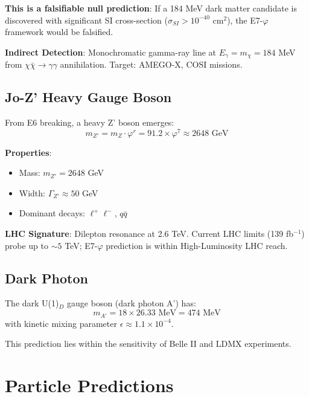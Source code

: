 \documentclass[11pt,a4paper]{article}
\begin{document}
\textbf{This is a falsifiable null prediction}: If a 184 MeV dark matter candidate is discovered with significant SI cross-section ($\sigma_{SI} > 10^{-40}$ cm$^2$), the E7-$\varphi$ framework would be falsified.

\textbf{Indirect Detection}: Monochromatic gamma-ray line at $E_\gamma = m_\chi = 184$ MeV from $\chi\bar{\chi} \to \gamma\gamma$ annihilation. Target: AMEGO-X, COSI missions.

\subsection{Jo-Z' Heavy Gauge Boson}

From E6 breaking, a heavy Z' boson emerges:
\begin{equation}
m_{Z'} = m_Z \cdot \varphi^r = 91.2 \times \varphi^7 \approx 2648 \text{ GeV}
\end{equation}

\textbf{Properties}:
\begin{itemize}
\item Mass: $m_{Z'} = 2648$ GeV
\item Width: $\Gamma_{Z'} \approx 50$ GeV
\item Dominant decays: $\ell^+\ell^-$, $q\bar{q}$
\end{itemize}

\textbf{LHC Signature}: Dilepton resonance at 2.6 TeV. Current LHC limits (139 fb$^{-1}$) probe up to $\sim 5$ TeV; E7-$\varphi$ prediction is within High-Luminosity LHC reach.

\subsection{Dark Photon}

The dark U(1)$_D$ gauge boson (dark photon A') has:
\begin{equation}
m_{A'} = 18 \times 26.33 \text{ MeV} = 474 \text{ MeV}
\end{equation}
with kinetic mixing parameter $\epsilon \approx 1.1 \times 10^{-4}$.

This prediction lies within the sensitivity of Belle II and LDMX experiments.

\section{Particle Predictions}
\end{document}
